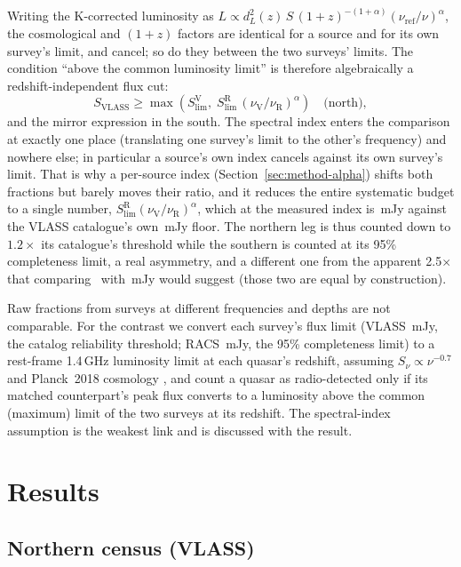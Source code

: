 \documentclass[twocolumn]{aastex631}
\begin{document}
Writing the K-corrected luminosity as
$L \propto d_L^2(z)\,S\,(1+z)^{-(1+\alpha)}(\nu_\mathrm{ref}/\nu)^{\alpha}$, the cosmological
and $(1+z)$ factors are identical for a source and for its own survey's limit, and cancel;
so do they between the two surveys' limits. The condition ``above the common luminosity
limit'' is therefore algebraically a redshift-independent flux cut:
\begin{equation}
S_\mathrm{VLASS} \ge \max\!\left(S^\mathrm{V}_\mathrm{lim},\;
S^\mathrm{R}_\mathrm{lim}\,(\nu_\mathrm{V}/\nu_\mathrm{R})^{\alpha}\right)
\quad\text{(north)},
\end{equation}
and the mirror expression in the south. The spectral index enters the comparison at exactly
one place (translating one survey's limit to the other's frequency) and nowhere else;
in particular a source's own index cancels against its own survey's limit. That is why a
per-source index (Section~\ref{sec:method-alpha}) shifts both fractions but barely moves
their ratio, and it reduces the entire systematic budget to a single number,
$S^\mathrm{R}_\mathrm{lim}(\nu_\mathrm{V}/\nu_\mathrm{R})^{\alpha}$, which at the measured
index is \drNorthEffCut\,mJy against the VLASS catalogue's own \drSlimVlass\,mJy floor. The
northern leg is thus counted down to $1.2\times$ its catalogue's threshold while the southern
is counted at its 95\% completeness limit, a real asymmetry, and a different one from the
apparent 2.5$\times$ that comparing \drNorthEffCut\ with \drSlimRacs\,mJy would suggest
(those two are equal by construction).

Raw fractions from surveys at different frequencies and depths are not comparable. For the
contrast we convert each survey's flux limit (VLASS \drSlimVlass\,mJy, the catalog
reliability threshold; RACS \drSlimRacs\,mJy, the 95\% completeness limit) to a rest-frame
1.4\,GHz luminosity limit at each quasar's redshift, assuming $S_\nu \propto \nu^{-0.7}$
and Planck~2018 cosmology \citep{planck18}, and count a quasar as radio-detected only if
its matched counterpart's peak flux converts to a luminosity above the common
(maximum) limit of the two surveys at its redshift. The spectral-index assumption is the
weakest link and is discussed with the result.

\section{Results}

\subsection{Northern census (VLASS)}
\end{document}
